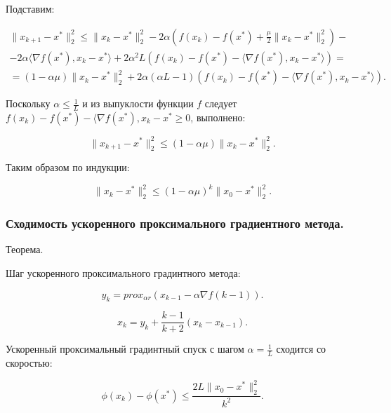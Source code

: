 Подставим:

\begin{equation}
    \begin{aligned}
        \|x_{k+1}-x^*\|_2^2\leq
        \|x_k-x^*\|_2^2-
        2\alpha\left(f(x_k)-f(x^*)+\frac\mu2\|x_k-x^*\|_2^2\right)-                \\-
        2\alpha\langle\nabla f(x^*),x_k-x^*\rangle+
        2\alpha^2 L\left(f(x_k)-f(x^*)-\langle\nabla f(x^*),x_k-x^*\rangle\right)= \\=
        (1-\alpha\mu)\|x_k-x^*\|_2^2+
        2\alpha(\alpha L-1)\left(f(x_k)-f(x^*)-\langle\nabla f(x^*),x_k-x^*\rangle\right).
    \end{aligned}
\end{equation}

Поскольку $\alpha\leq\frac1L$ и из выпуклости функции $f$ следует $f(x_k)-f(x^*)-\langle\nabla f(x^*),x_k-x^*\geq0$, выполнено:

\begin{equation}
    \|x_{k+1}-x^*\|_2^2\leq(1-\alpha\mu)\|x_k-x^*\|_2^2.
\end{equation}

Таким образом по индукции:

\begin{equation}
    \|x_k-x^*\|_2^2\leq(1-\alpha\mu)^k\|x_0-x^*\|_2^2.
\end{equation}

\subsubsection*{Сходимость ускоренного проксимального градиентного метода.}

Теорема.

Шаг ускоренного проксимального градинтного метода:

\begin{equation}
    y_k=prox_{\alpha r}(x_{k-1}-\alpha\nabla f({k-1})).
\end{equation}

\begin{equation}
    x_k=y_k+\frac{k-1}{k+2}(x_k-x_{k-1}).
\end{equation}

Ускоренный проксимальный градинтный спуск с шагом $\alpha=\frac1L$ сходится со скоростью:

\begin{equation}
    \phi(x_k)-\phi(x^*)\leq\frac{2L\|x_0-x^*\|_2^2}{k^2}.
\end{equation}

